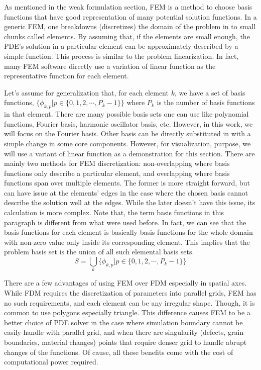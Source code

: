 \documentclass[preprint, 12pt]{revtex4-2}
\numberwithin{equation}{section}
\begin{document}
As mentioned in the weak formulation section, FEM is a method to choose basis functions that have good representation of many potential solution functions. In a generic FEM, one breakdowns (discretizes) the domain of the problem in to small chunks called elements. By assuming that, if the elements are small enough, the PDE's solution in a particular element can be approximately described by a simple function. This process is similar to the problem linearization. In fact, many FEM software directly use a variation of linear function as the representative function for each element. 

Let's assume for generalization that, for each element $k$, we have a set of basis functions, $\{\phi_{k,p}|p\in \{0, 1, 2, \cdots, P_k-1\}\}$ where $P_k$ is the number of basis functions in that element. There are many possible basis sets one can use like polynomial functions, Fourier basis, harmonic oscillator basis, etc. However, in this work, we will focus on the Fourier basis. Other basis can be directly substituted in with a simple change in some core components. However, for visualization, purpose, we will use a variant of linear function as a demonstration for this section. There are mainly two methods for FEM discretization: non-overlapping where basis functions only describe a particular element, and overlapping where basis functions span over multiple elements. The former is more straight forward, but can have issue at the elements' edges in the case where the chosen basis cannot describe the solution well at the edges. While the later doesn't have this issue, its calculation is more complex. Note that, the term basis functions in this paragraph is different from what were used before. In fact, we can see that the basis functions for each element is basically basis functions for the whole domain with non-zero value only inside its corresponding element. This implies that the problem basis set is the union of all such elemental basis sets.
\begin{equation}
    S = \bigcup_k\{\phi_{k,p}|p\in\{0, 1, 2, \cdots, P_k-1\}\}
\end{equation}

There are a few advantages of using FEM over FDM especially in spatial axes. While FDM requires the discretization of parameters into parallel grids, FEM has no such requirements, and each element can be any irregular shape. Though, it is common to use polygons especially triangle. This difference causes FEM to be a better choice of PDE solver in the case where simulation boundary cannot be easily handle with parallel grid, and when there are singularity (defects, grain boundaries, material changes) points that require denser grid to handle abrupt changes of the functions. Of cause, all these benefits come with the cost of computational power required.
\end{document}
